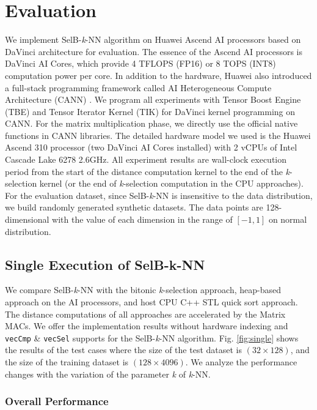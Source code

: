 \documentclass[12pt]{extbook}
\begin{document}
\section{Evaluation}

We implement SelB-\textit{k}-NN algorithm on Huawei Ascend AI processors based on DaVinci \cite{DBLP:conf/hotchips/LiaoTXZ19} architecture for evaluation. The essence of the Ascend AI processors is DaVinci AI Cores, which provide 4 TFLOPS (FP16) or 8 TOPS (INT8) computation power per core. In addition to the hardware, Huawei also introduced a full-stack programming framework called AI Heterogeneous Compute Architecture (CANN) \cite{CANN}. We program all experiments with Tensor Boost Engine (TBE) and Tensor Iterator Kernel (TIK) for DaVinci kernel programming on CANN. For the matrix multiplication phase, we directly use the official native functions in CANN libraries. The detailed hardware model we used is the Huawei Ascend 310 processor (two DaVinci AI Cores installed) with 2 vCPUs of Intel Cascade Lake 6278 2.6GHz. All experiment results are wall-clock execution period from the start of the distance computation kernel to the end of the \textit{k}-selection kernel (or the end of \textit{k}-selection computation in the CPU approaches). For the evaluation dataset, since SelB-\textit{k}-NN is insensitive to the data distribution, we build randomly generated synthetic datasets. The data points are 128-dimensional with the value of each dimension in the range of $[-1, 1]$ on normal distribution.

\subsection{Single Execution of SelB-k-NN}

We compare SelB-\textit{k}-NN with the bitonic \textit{k}-selection approach, heap-based approach on the AI processors, and host CPU C++ STL quick sort approach. The distance computations of all approaches are accelerated by the Matrix MACs. We offer the implementation results without hardware indexing and \verb|vecCmp| \& \verb|vecSel| supports for the SelB-\textit{k}-NN algorithm. Fig. \ref{fig:single} shows the results of the test cases where the size of the test dataset is $(32 \times 128)$, and the size of the training dataset is $(128 \times 4096)$. We analyze the performance changes with the variation of the parameter \textit{k} of \textit{k}-NN.

\subsubsection{Overall Performance}
\end{document}
